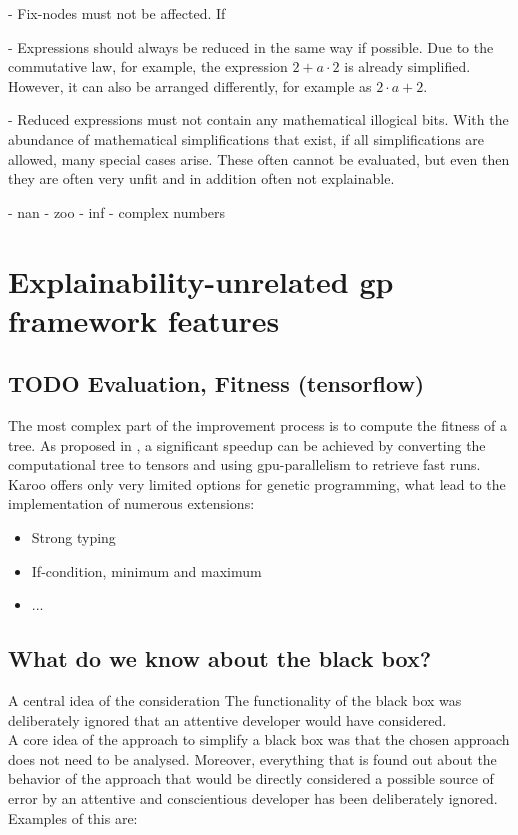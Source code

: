 - Fix-nodes must not be affected. If 

- Expressions should always be reduced in the same way if possible. Due to the commutative law, for example, the expression $2+a\cdot 2$ is already simplified. However, it can also be arranged differently, for example as $2\cdot a+2$.

- Reduced expressions must not contain any mathematical illogical bits. With the abundance of mathematical simplifications that exist, if all simplifications are allowed, many special cases arise. These often cannot be evaluated, but even then they are often very unfit and in addition often not explainable.

- nan
- zoo
- inf
- complex numbers

\section{Explainability-unrelated gp framework features}

\subsection{TODO Evaluation, Fitness (tensorflow)}
The most complex part of the improvement process is to compute the fitness of a tree. As proposed in \cite{karooGPpaper}, a significant speedup can be achieved by converting the computational tree to tensors and using gpu-parallelism to retrieve fast runs. Karoo offers only very limited options for genetic programming, what lead to the implementation of numerous extensions:
\begin{itemize}
    \item Strong typing
    \item If-condition, minimum and maximum
    \item ...
\end{itemize}


\subsection{What do we know about the black box?}

A central idea of the consideration 
The functionality of the black box was deliberately ignored that an attentive developer would have considered.\\ 
A core idea of the approach to simplify a black box was that the chosen approach does not need to be analysed. Moreover, everything that is found out about the behavior of the approach that would be directly considered a possible source of error by an attentive and conscientious developer has been deliberately ignored.
Examples of this are:
